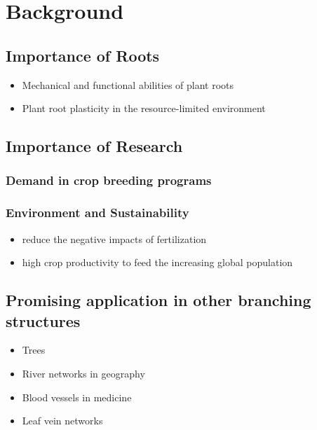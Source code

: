


\section{Background}

   \subsection{Importance of Roots}
      \begin{itemize}
        \item Mechanical and functional abilities of plant roots
        \item Plant root plasticity in the resource-limited environment
      \end{itemize}
      
     \subsection{Importance of Research}
       \subsubsection{Demand in crop breeding programs}
       \subsubsection{Environment and Sustainability}

         \begin{itemize}
           \item reduce the negative impacts of fertilization
           \item high crop productivity to feed the increasing global population
         \end{itemize}
         
       \subsection{Promising application in other branching structures}
         \begin{itemize}
           \item Trees
           \item River networks in geography
           \item Blood vessels in medicine
           \item Leaf vein networks
         \end{itemize}
